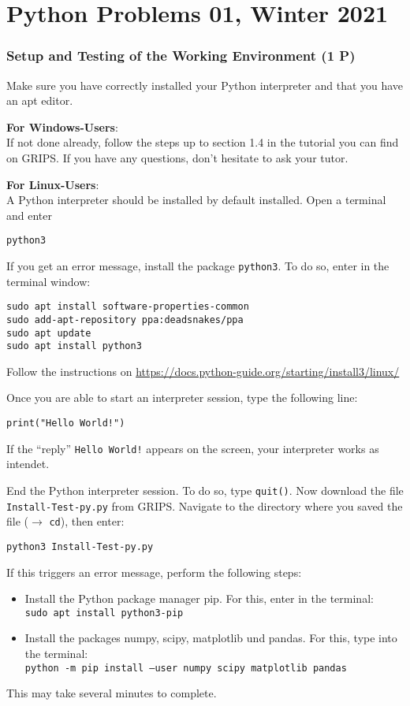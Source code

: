 \documentclass[
	english,
	fontsize=10pt,
	parskip=half,
	titlepage=true,
	DIV=12
]{scrartcl}
\begin{document}
\part*{Python Problems 01, Winter 2021}

\section{Setup and Testing of the Working Environment (1 P)}
Make sure you have correctly installed your Python interpreter and that you have an apt editor.

\textbf{For Windows-Users}:\\
If not done already, follow the steps up to section 1.4 in the tutorial you can find on GRIPS. If you have any questions, don't hesitate to ask your tutor.

\textbf{For Linux-Users}:\\
A Python interpreter should be installed by default installed. Open a terminal and enter
\begin{center}
	\texttt{python3}
\end{center}
If you get an error message, install the package \texttt{python3}. To do so, enter in the terminal window:
\begin{center}
	\texttt{sudo apt install software-properties-common}\\
	\texttt{sudo add-apt-repository ppa:deadsnakes/ppa}\\
	\texttt{sudo apt update}\\
	\texttt{sudo apt install python3}
\end{center}

Follow the instructions on \url{https://docs.python-guide.org/starting/install3/linux/}

Once you are able to start an interpreter session, type the following line:
\begin{center}
	\texttt{print("Hello World!")}
\end{center}
If the \enquote{reply} \texttt{Hello World!} appears on the screen, your interpreter works as intendet.

End the Python interpreter session. To do so, type \texttt{quit()}. Now download the file  \texttt{Install-Test-py.py} from GRIPS. Navigate to the directory where you saved the file ($\rightarrow$ \texttt{cd}), then enter:
\begin{center}
	\texttt{python3 Install-Test-py.py}
\end{center}

If this triggers an error message, perform the following steps:
\begin{itemize}
\item Install the Python package manager pip. For this, enter in the terminal:\\
	\texttt{sudo apt install python3-pip}
\item Install the packages numpy, scipy, matplotlib und pandas. For this, type into the terminal:\\
	\texttt{python -m pip install --user numpy scipy matplotlib pandas}
\end{itemize}
This may take several minutes to complete.
\end{document}
